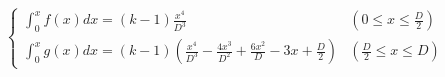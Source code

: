 \documentclass[
  11pt,
  border=2,
  convert={
    density=100 -alpha remove,
    outext=.png
  },
]{standalone}
\begin{document}
$
  \begin{cases}
    \displaystyle \int_0^x f(x) dx = (k-1)\frac{x^4}{D^3} 
      & \left(0 \leq x \leq \frac{D}{2}\right)
    \\
    \displaystyle \int_0^x g(x) dx = (k-1)\left( \frac{x^4}{D^3} - \frac{4x^3}{D^2} + \frac{6x^2}{D} - 3x + \frac{D}{2} \right) 
      & \left(\frac{D}{2} \leq x \leq D\right)
  \end{cases}
$
\end{document}
